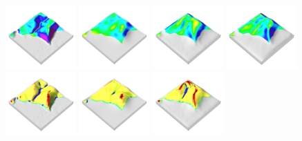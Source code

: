 \documentclass[prodmode,acmtochi]{acmsmall} %
\begin{document}
\begin{figure}[h!]
\begin{center}
		\includegraphics[width=0.24\textwidth]{images/render_3d/slope_1.png}
		\includegraphics[width=0.24\textwidth]{images/render_3d/mean_slope_1.png}
		\includegraphics[width=0.24\textwidth]{images/render_3d/mean_slope_2.png}
		\includegraphics[width=0.24\textwidth]{images/render_3d/mean_slope_3.png}
		\includegraphics[width=0.24\textwidth]{images/render_3d/forms_1.png}
		\includegraphics[width=0.24\textwidth]{images/render_3d/mean_forms_1.png}
		\includegraphics[width=0.24\textwidth]{images/render_3d/mean_forms_2.png}

\end{center}
\end{figure}
\end{document}

